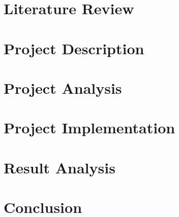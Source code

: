 \documentclass[Times,12pt,oneside,openany,print,index]{report}
\begin{document}
\chapter{Literature Review}


\chapter{Project Description}
\label{ch:project-description}


\chapter{Project Analysis}
\label{ch:project-analysis}


\chapter{Project Implementation}
\label{ch:implementation}


\chapter{Result Analysis}


\chapter{Conclusion}


\printbibliography[heading=bibintoc] %

%
%
%
%
\end{document}

